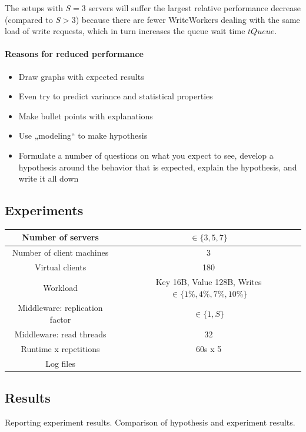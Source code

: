 \documentclass[11pt]{article}
\newcommand{\todo}[1]{\fcolorbox{black}{Apricot}{TODO: #1}}
\begin{document}
The setups with $S=3$ servers will suffer the largest relative performance decrease (compared to $S > 3$) because there are fewer WriteWorkers dealing with the same load of write requests, which in turn increases the queue wait time $tQueue$.

\paragraph{Reasons for reduced performance}


\begin{itemize}
\item Draw graphs with expected results
\item Even try to predict variance and statistical properties
\item Make bullet points with explanations
\item Use „modeling“ to make hypothesis
\item Formulate a number of questions on what you expect to see, develop a hypothesis around the behavior that is expected, explain the hypothesis, and write it all down
\end{itemize}

\subsection{Experiments}
\begin{center}
\small{
\smallskip
\begin{tabular}{|c|c|}
\hline Number of servers & $\in \{3, 5, 7\}$ \\ 
\hline Number of client machines & 3 \\ 
\hline Virtual clients & 180 \\ 
\hline Workload & Key 16B, Value 128B, Writes $\in \{1\%, 4\%, 7\%, 10\%\}$ \\
\hline Middleware: replication factor & $\in \{1, S\}$ \\ 
\hline Middleware: read threads & 32 \\ 
\hline Runtime x repetitions & 60s x 5 \todo{} \\ 
\hline Log files & \todo{} \\
\hline 
\end{tabular} }
\end{center}

\subsection{Results}
Reporting experiment results. Comparison of hypothesis and experiment results.
\end{document}
